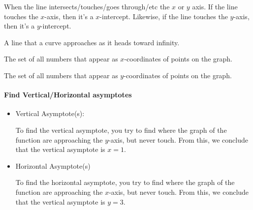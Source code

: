 
\begin{definition}[Intercept]
  \label{def:intercept}

  When the line intersects/touches/goes through/etc the $x$ or $y$ axis. If the
  line touches the $x$-axis, then it's a $x$-intercept. Likewise, if the line
  touches the $y$-axis, then it's a $y$-intercept.
\end{definition}

\begin{definition}[Asymptotes]
  \label{def:asymptotes}

  A line that a curve approaches as it heads toward infinity.
\end{definition}

\begin{definition}[Domain]
  \label{def:domain}

  The set of all numbers that appear as $x$-coordinates of points on the graph.
\end{definition}

\begin{definition}[Range]
  \label{def:domain}

  The set of all numbers that appear as $y$-coordinates of points on the graph.
\end{definition}

\paragraph{Find Vertical/Horizontal asymptotes}
\label{par:find_vertical_horizontal_asymptotes}

\begin{marginfigure}
    \centering
    \caption{Vertical and Horizontal Asymptotes}
    \label{fig:vertical_and_horizontal_asymptotes}
\end{marginfigure}

\begin{itemize}
  \label{item:find_vertical_horizontal_asymptotes}

  \item Vertical Asymptote(s):

    To find the vertical asymptote, you try to find where the graph of the
    function are approaching the $y$-axis, but never touch. From this, we
    conclude that the vertical asymptote is $x = 1$.

  \item Horizontal Asymptote(s)

    To find the horizontal asymptote, you try to find where the graph of the
    function are approaching the $x$-axis, but never touch. From this, we
    conclude that the vertical asymptote is $y = 3$.
\end{itemize}

